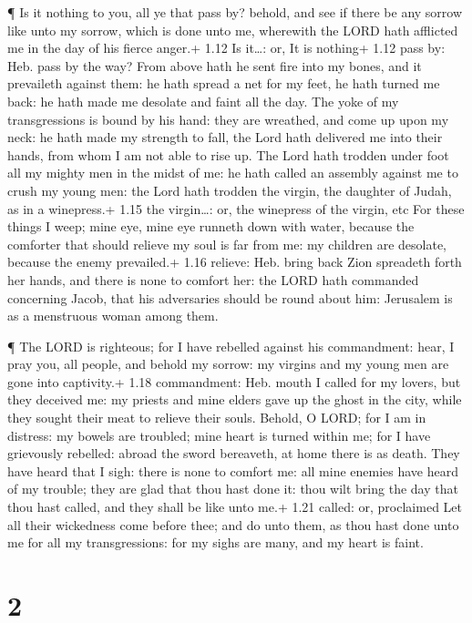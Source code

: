  ¶ Is it nothing to you, all ye that pass by? behold, and
see if there be any sorrow like unto my sorrow, which is done unto me,
wherewith the LORD hath afflicted me in the day of his fierce anger.+
1.12 Is it\ldots: or, It is nothing+ 1.12 pass by: Heb. pass by the way?
 From above hath he sent fire into my bones, and it
prevaileth against them: he hath spread a net for my feet, he hath
turned me back: he hath made me desolate and faint all the day.
 The yoke of my transgressions is bound by his hand: they
are wreathed, and come up upon my neck: he hath made my strength to
fall, the Lord hath delivered me into their hands, from whom I am not
able to rise up.  The Lord hath trodden under foot all my
mighty men in the midst of me: he hath called an assembly against me to
crush my young men: the Lord hath trodden the virgin, the daughter of
Judah, as in a winepress.+ 1.15 the virgin\ldots: or, the winepress of
the virgin, etc  For these things I weep; mine eye, mine
eye runneth down with water, because the comforter that should relieve
my soul is far from me: my children are desolate, because the enemy
prevailed.+ 1.16 relieve: Heb. bring back  Zion spreadeth
forth her hands, and there is none to comfort her: the LORD hath
commanded concerning Jacob, that his adversaries should be round about
him: Jerusalem is as a menstruous woman among them.

 ¶ The LORD is righteous; for I have rebelled against his
commandment: hear, I pray you, all people, and behold my sorrow: my
virgins and my young men are gone into captivity.+ 1.18 commandment:
Heb. mouth  I called for my lovers, but they deceived me:
my priests and mine elders gave up the ghost in the city, while they
sought their meat to relieve their souls.  Behold, O LORD;
for I am in distress: my bowels are troubled; mine heart is turned
within me; for I have grievously rebelled: abroad the sword bereaveth,
at home there is as death.  They have heard that I sigh:
there is none to comfort me: all mine enemies have heard of my trouble;
they are glad that thou hast done it: thou wilt bring the day that thou
hast called, and they shall be like unto me.+ 1.21 called: or,
proclaimed  Let all their wickedness come before thee; and
do unto them, as thou hast done unto me for all my transgressions: for
my sighs are many, and my heart is faint.

\hypertarget{section-1}{%
\section{2}\label{section-1}}

